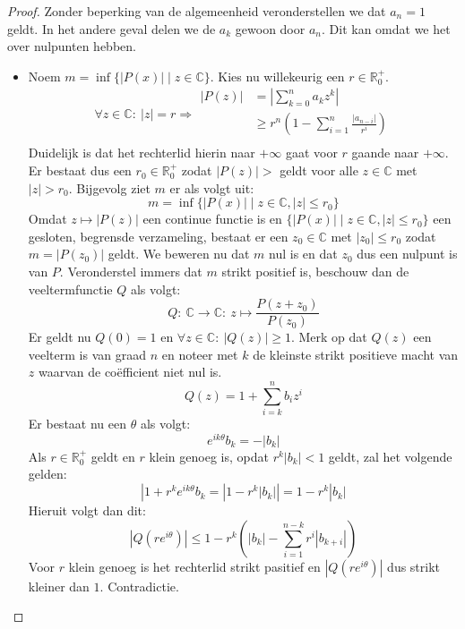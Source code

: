 \documentclass[main.tex]{subfiles}
\begin{document}
\begin{bst}
  \begin{proof}
    Zonder beperking van de algemeenheid veronderstellen we dat $a_{n}=1$ geldt.
    In het andere geval delen we de $a_{k}$ gewoon door $a_{n}$.
    Dit kan omdat we het over nulpunten hebben.
    \begin{itemize}
    \item Noem $m = \inf\{ |P(x)| \mid z\in \mathbb{C} \}$.
      Kies nu willekeurig een $r\in \mathbb{R}_{0}^{+}$.
      \[
      \forall z\in \mathbb{C}:\ |z| = r \Rightarrow
      \begin{array}{rl}
        |P(z)|
        &= \left|\sum_{k=0}^{n}a_{k}z^{k}\right|\\
        &\ge r^{n}\left( 1 - \sum_{i=1}^{n}\frac{|a_{n-i}|}{r^{i}}\right)\\
      \end{array}     
      \]
      Duidelijk is dat het rechterlid hierin naar $+\infty$ gaat voor $r$ gaande naar $+\infty$.
      Er bestaat dus een $r_{0}\in \mathbb{R}_{0}^{+}$ zodat $|P(z)| > $ geldt voor alle $z\in \mathbb{C}$ met $|z| > r_{0}$.
      Bijgevolg ziet $m$ er als volgt uit:
      \[ m =  \inf\{ |P(x)| \mid z\in \mathbb{C}, |z| \le r_{0} \} \]
      Omdat $z \mapsto |P(z)|$ een continue functie is en $\{ |P(x)| \mid z\in \mathbb{C}, |z| \le r_{0} \}$ een gesloten, begrensde verzameling, bestaat er een $z_{0}\in \mathbb{C}$ met $|z_{0}| \le r_{0}$ zodat $m = |P(z_{0})|$ geldt.\waarom
      We beweren nu dat $m$ nul is en dat $z_{0}$ dus een nulpunt is van $P$.
      Veronderstel immers dat $m$ strikt positief is, beschouw dan de veeltermfunctie $Q$ als volgt:
      \[ Q:\ \mathbb{C} \rightarrow \mathbb{C}:\ z \mapsto \frac{P(z+z_{0})}{P(z_{0})} \]
      Er geldt nu $Q(0)=1$ en $\forall z \in \mathbb{C}:\ |Q(z)| \ge 1$.
      Merk op dat $Q(z)$ een veelterm is van graad $n$ en noteer met $k$ de kleinste strikt positieve macht van $z$ waarvan de co\"efficient niet nul is.
      \[ Q(z) = 1+ \sum_{i=k}^{n}b_{i}z^{i} \]
      Er bestaat nu een $\theta$ als volgt:\needed
      \[ e^{ik\theta}b_{k} = -|b_{k}| \]
      Als $r\in \mathbb{R}_{0}^{+}$ geldt en $r$ klein genoeg is, opdat $r^{k}|b_{k}|<1$ geldt, zal het volgende gelden:
      \[ |1+r^{k}e^{ik\theta}b_{k} = |1-r^{k}|b_{k}|| = 1-r^{k}|b_{k}| \]
      Hieruit volgt dan dit:
      \[ |Q(re^{i\theta})| \le 1-r^{k}\left(|b_{k}| - \sum_{i=1}^{n-k}r^{i}|b_{k+i}|\right) \]
      Voor $r$ klein genoeg is het rechterlid strikt pasitief en $|Q(re^{i\theta})|$ dus strikt kleiner dan $1$.
      Contradictie.
    \end{itemize}
  \end{proof}
\end{bst}
\end{document}
